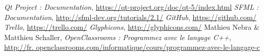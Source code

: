 \makeatletter
\renewcommand\refname{Références \& Ressources utilisées}
\makeatother

\begin{thebibliography}{10}
	 \emph{Qt Project : Documentation}, \href{https://qt-project.org/doc/qt-5/index.html}{https://qt-project.org/doc/qt-5/index.html}
	 \emph{SFML : Documentation}, \href{http://sfml-dev.org/tutorials/2.1/}{http://sfml-dev.org/tutorials/2.1/}
	 \emph{GitHub}, \href{https://github.com/}{https://github.com/}
	 \emph{Trello}, \href{https://trello.com/}{https://trello.com/}
	 \emph{Glyphicons}, \href{http://glyphicons.com/}{http://glyphicons.com/}
	 Mathieu Nebra \& Matthieu Schaller, \emph{OpenClassrooms : Programmez avec le langage C++}, \href{http://fr.openclassrooms.com/informatique/cours/programmez-avec-le-langage-c}{http://fr. openclassrooms.com/informatique/cours/programmez-avec-le-langage-c	}
\end{thebibliography}
